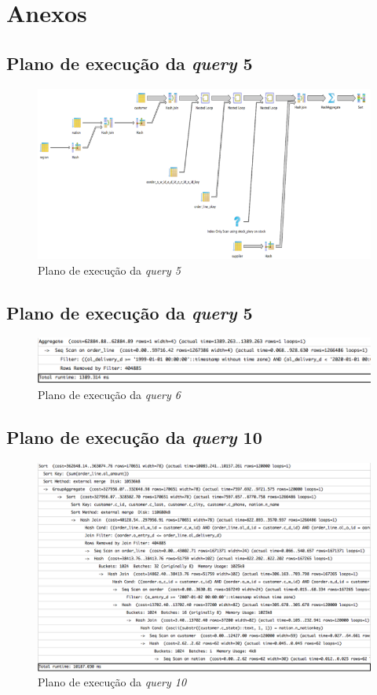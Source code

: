 \section{Anexos}



\subsection{Plano de execução da \textit{query} 5}

\begin{figure}[ht!]
\centering
\includegraphics[width=\textwidth]{img/00_query5_ant}
\caption{Plano de execução da \textit{query 5}\label{overflow}}
\end{figure}

\subsection{Plano de execução da \textit{query} 5}

\begin{figure}[ht!]
\centering
\includegraphics[width=\textwidth]{img/00_query6_ant}
\caption{Plano de execução da \textit{query 6}\label{overflow}}
\end{figure}

\newpage

\subsection{Plano de execução da \textit{query} 10}

\begin{figure}[ht!]
\centering
\includegraphics[width=\textwidth]{img/00_query10_ant}
\caption{Plano de execução da \textit{query 10}\label{overflow}}
\end{figure}
